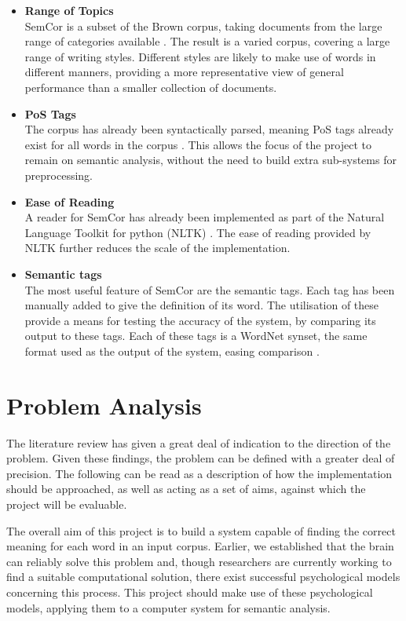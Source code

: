 \documentclass[]{article}
\begin{document}
\begin{itemize}
	\item \textbf{Range of Topics} \\
	SemCor is a subset of the Brown corpus, taking documents from the large range of categories available \cite{SEMCOR}. The result is a varied corpus, covering a large range of writing styles. Different styles are likely to make use of words in different manners, providing a more representative view of general performance than a smaller collection of documents.
	
	\item \textbf{PoS Tags} \\
	The corpus has already been syntactically parsed, meaning PoS tags already exist for all words in the corpus \cite{SEMCOR}. This allows the focus of the project to remain on semantic analysis, without the need to build extra sub-systems for preprocessing.
	
		\item \textbf{Ease of Reading} \\
	A reader for SemCor has already been implemented as part of the Natural Language Toolkit for python (NLTK) \cite{NLTK}. The ease of reading provided by NLTK further reduces the scale of the implementation.
	
	\item \textbf{Semantic tags} \\
	The most useful feature of SemCor are the semantic tags. Each tag has been manually added to give the definition of its word. The utilisation of these provide a means for testing the accuracy of the system, by comparing its output to these tags. Each of these tags is a WordNet synset, the same format used as the output of the system, easing comparison \cite{SEMCOR}.
\end{itemize}

\section{Problem Analysis}
\label{sec:ProbAnalysis}

The literature review has given a great deal of indication to the direction of the problem. Given these findings, the problem can be defined with a greater deal of precision. The following can be read as a description of how the implementation should be approached, as well as acting as a set of aims, against which the project will be evaluable.

The overall aim of this project is to build a system capable of finding the correct meaning for each word in an input corpus. Earlier, we established that the brain can reliably solve this problem and, though researchers are currently working to find a suitable computational solution, there exist successful psychological models concerning this process. This project should make use of these psychological models, applying them to a computer system for semantic analysis.
\end{document}
